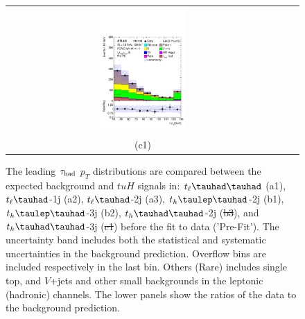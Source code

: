 \documentclass[PAPER, coverpage, atlasdraft=true, texlive=2016, UKenglish]{\ATLASLATEXPATH atlasdoc}
\providecommand{\DIFadd}[1]{{\protect\color{blue}\uwave{#1}}} %
\providecommand{\DIFdel}[1]{{\protect\color{red}\sout{#1}}}                      %
\providecommand{\DIFaddFL}[1]{\DIFadd{#1}} %
\providecommand{\DIFdelFL}[1]{\DIFdel{#1}} %
\providecommand{\DIFaddbeginFL}{} %
\providecommand{\DIFaddendFL}{} %
\providecommand{\DIFdelbeginFL}{} %
\providecommand{\DIFdelendFL}{} %
\begin{document}
\begin{figure}[H]
\begin{tabular}{@{}ccc@{}}
\DIFaddbeginFL \includegraphics[page=1,width=0.33\textwidth]{figures/new_pt/reg2mtau1b3jos_vetobtagwp70_highmet.pdf}\DIFaddendFL \\
(c1) \DIFaddbeginFL & \DIFaddFL{(c2) }\DIFaddendFL \\
\end{tabular}
\caption{The leading $\tau_\text{had}$ $p_T$  distributions are compared between the expected background and $tuH$ signals in: $t_{\ell}\thadhad$ (a1),  $t_{\ell}\tauhad$-1j (a2),  $t_{\ell}\tauhad$-2j (a3), $t_h\tlhad$-2j (b1), $t_h\tlhad$-3j (b2), $t_h\thadhad$-2j (\DIFdelbeginFL \DIFdelFL{b3}\DIFdelendFL \DIFaddbeginFL \DIFaddFL{c1}\DIFaddendFL ), and $t_h\thadhad$-3j (\DIFdelbeginFL \DIFdelFL{c1}\DIFdelendFL \DIFaddbeginFL \DIFaddFL{c2}\DIFaddendFL ) before the fit to data ('Pre-Fit'). The uncertainty band includes both the statistical and systematic uncertainties in the background prediction. Overflow bins are included respectively in the last bin. Others (Rare) includes single top, and $V$+jets and other small backgrounds in the leptonic (hadronic) 
channels. 
The lower panels show the ratios of the data to the background prediction.}
\label{fig:taupt_prefit}
\end{figure}
\end{document}
